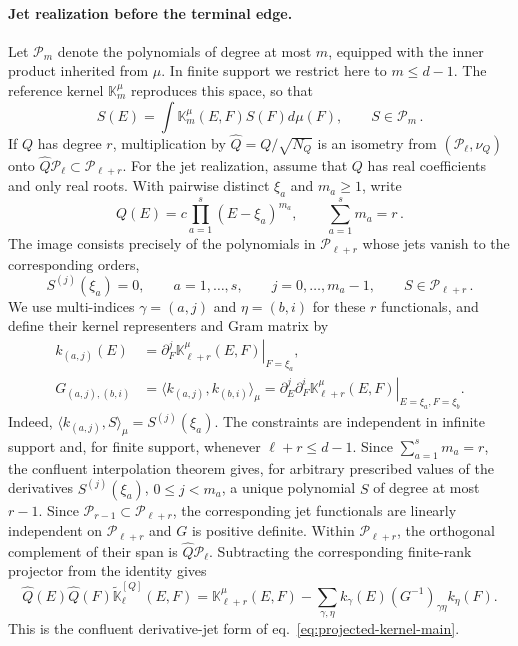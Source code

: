 \documentclass[a4paper,11pt]{article}
\def\dd{d}%
\theoremstyle{definition}
\theoremstyle{remark}
\newcommand{\dd}{\mathrm d}
\newcommand{\cP}{\mathcal P}
\newcommand{\tK}{\widetilde{\mathbb K}}
\newcommand{\Qhat}{\widehat Q}
\begin{document}
\paragraph{Jet realization before the terminal edge.}
Let $\cP_m$ denote the polynomials of degree at most $m$, equipped with
the inner product inherited from $\mu$.  In finite support we restrict
here to $m\le d-1$.  The reference kernel $\mathbb K_m^\mu$ reproduces this
space, so that
\begin{equation}
   S(E)=\int \mathbb K_m^\mu(E,F)S(F)\dd\mu(F),
   \qquad S\in\cP_m\,.
\end{equation}
If $Q$ has degree $r$, multiplication by
$\Qhat=Q/\sqrt{N_Q}$ is an isometry from $(\cP_\ell,\nu_Q)$ onto
$\Qhat\cP_\ell\subset\cP_{\ell+r}$.  For the jet realization, assume
that $Q$ has real coefficients and only real roots.  With pairwise
distinct $\xi_a$ and $m_a\ge1$, write
\begin{equation}
   Q(E)=c\prod_{a=1}^{s}(E-\xi_a)^{m_a},
   \qquad
   \sum_{a=1}^{s}m_a=r\,.
\end{equation}
The image consists precisely of the polynomials in $\cP_{\ell+r}$ whose
jets vanish to the corresponding orders,
\begin{equation}
   S^{(j)}(\xi_a)=0,
   \qquad
   a=1,\ldots,s,
   \qquad
   j=0,\ldots,m_a-1,
   \qquad
   S\in\cP_{\ell+r}\,.
   \label{eq:kernel-jet-constraints-app}
\end{equation}
We use multi-indices $\gamma=(a,j)$ and $\eta=(b,i)$ for these $r$
functionals, and define their kernel representers and Gram matrix by 
\begin{equation}
\begin{aligned}
   k_{(a,j)}(E)
   &=\left.
      \partial_F^j \mathbb K_{\ell+r}^{\mu}(E,F)
      \right|_{F=\xi_a},\\
   G_{(a,j),(b,i)}
   &=\langle k_{(a,j)},k_{(b,i)}\rangle_\mu
   =\left.
      \partial_E^j\partial_F^i
      \mathbb K_{\ell+r}^{\mu}(E,F)
      \right|_{E=\xi_a,F=\xi_b}.
\end{aligned}
   \label{eq:jet-gram-app}
\end{equation}
Indeed,
$\langle k_{(a,j)},S\rangle_\mu=S^{(j)}(\xi_a)$.
The constraints are independent in infinite support and, for finite
support, whenever $\ell+r\le d-1$. Since $\sum_{a=1}^{s}m_a=r$, the confluent interpolation theorem gives,
for arbitrary prescribed values of the derivatives
$S^{(j)}(\xi_a)$, $0\le j<m_a$, a unique polynomial $S$ of degree at
most $r-1$. Since $\cP_{r-1}\subset\cP_{\ell+r}$, the corresponding jet
functionals are linearly independent on $\cP_{\ell+r}$  and $G$ is positive definite. Within $\cP_{\ell+r}$, the orthogonal complement of their span is
$\Qhat\cP_\ell$.  Subtracting the corresponding finite-rank projector
from the identity gives
\begin{equation}
   \Qhat(E)\Qhat(F)\tK_\ell^{[Q]}(E,F)
   =\mathbb K_{\ell+r}^{\mu}(E,F)
   -\sum_{\gamma,\eta}
      k_\gamma(E)(G^{-1})_{\gamma\eta}k_\eta(F).
   \label{eq:jet-kernel-app}
\end{equation}
This is the confluent derivative-jet form of
eq.~\eqref{eq:projected-kernel-main}.
\end{document}
